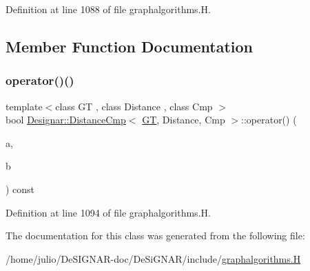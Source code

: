 Definition at line 1088 of file graphalgorithms.\+H.



\subsection{Member Function Documentation}
\mbox{\label{class_designar_1_1_distance_cmp_a5de92b27c64e3493d950a99018d28671}} 
\subsubsection{\texorpdfstring{operator()()}{operator()()}}
{\footnotesize\ttfamily template$<$class GT , class Distance , class Cmp $>$ \\
bool \hyperlink{class_designar_1_1_distance_cmp}{Designar\+::\+Distance\+Cmp}$<$ \hyperlink{demo-buildgraph_8_c_a3001c40d2c31ca87ed96cd7d1334a55e}{GT}, Distance, Cmp $>$\+::operator() (\begin{DoxyParamCaption}\item[{typename G\+T\+::\+Arc \&}]{a,  }\item[{typename G\+T\+::\+Arc \&}]{b }\end{DoxyParamCaption}) const\hspace{0.3cm}{\ttfamily [inline]}}



Definition at line 1094 of file graphalgorithms.\+H.



The documentation for this class was generated from the following file\+:\begin{DoxyCompactItemize}
\item 
/home/julio/\+De\+S\+I\+G\+N\+A\+R-\/doc/\+De\+Si\+G\+N\+A\+R/include/\hyperlink{graphalgorithms_8_h}{graphalgorithms.\+H}\end{DoxyCompactItemize}
